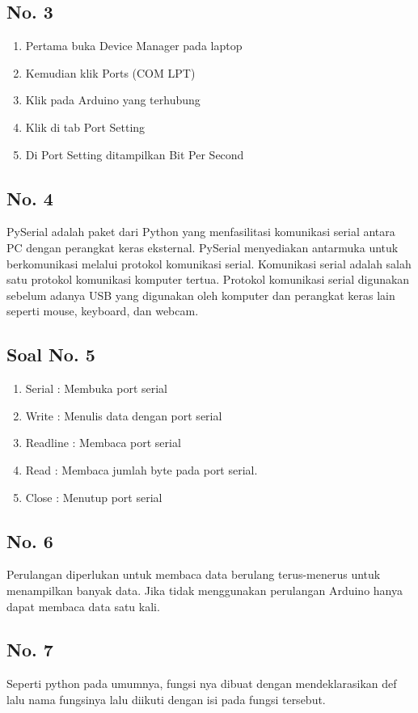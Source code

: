 \subsection{No. 3}
\begin{enumerate}
    \item Pertama buka Device Manager pada laptop
    \item Kemudian klik Ports (COM LPT)
    \item Klik pada Arduino yang terhubung
    \item Klik di tab Port Setting
    \item Di Port Setting ditampilkan Bit Per Second
\end{enumerate}

\subsection{No. 4}
PySerial adalah paket dari Python yang menfasilitasi komunikasi serial antara PC dengan perangkat keras eksternal. PySerial menyediakan antarmuka untuk berkomunikasi melalui protokol komunikasi serial. Komunikasi serial adalah salah satu protokol komunikasi komputer tertua. Protokol komunikasi serial digunakan sebelum adanya USB yang digunakan oleh komputer dan perangkat keras lain seperti mouse, keyboard, dan webcam.

\subsection{Soal No. 5}
\begin{enumerate}
	\item Serial 		: Membuka port serial
	\item Write 		: Menulis data dengan port serial
	\item Readline  	: Membaca port serial
	\item Read	    	: Membaca jumlah byte pada port serial.
	\item Close	    	: Menutup port serial

\end{enumerate}

\subsection{No. 6}
Perulangan diperlukan untuk membaca data berulang terus-menerus untuk menampilkan banyak data. Jika tidak menggunakan perulangan Arduino hanya dapat membaca data satu kali. 

\subsection{No. 7}
Seperti python pada umumnya, fungsi nya dibuat dengan mendeklarasikan def lalu nama fungsinya lalu diikuti dengan isi pada fungsi tersebut.

